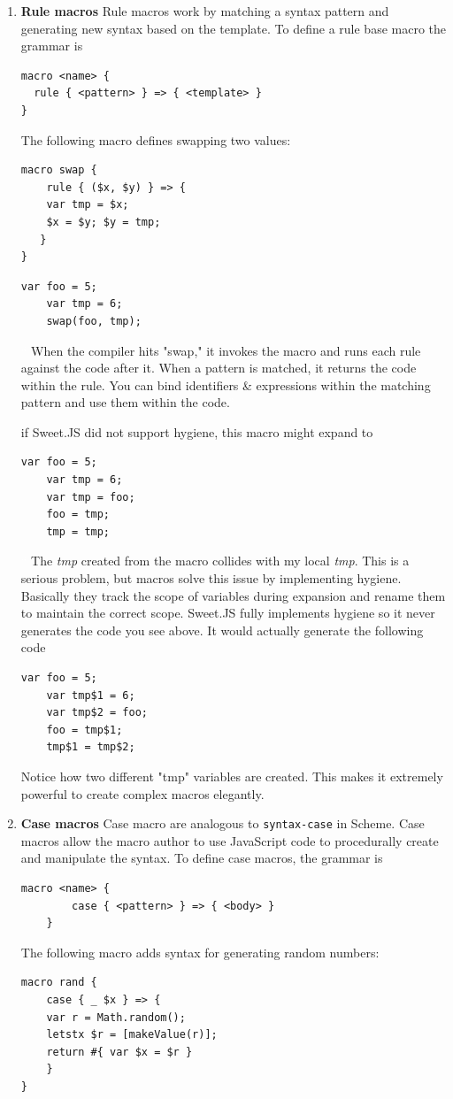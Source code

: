 \begin{enumerate}
\item {\bf Rule macros }
Rule macros work by matching a syntax pattern and generating new syntax based on the template.
To define a rule base macro the grammar is
\begin{lstlisting}[frame=single]
macro <name> {
  rule { <pattern> } => { <template> }
}
\end{lstlisting} 

The following macro defines swapping two values:
\begin{lstlisting}[frame=single]
macro swap {
	rule { ($x, $y) } => {
	var tmp = $x;
	$x = $y; $y = tmp;
   }
}
\end{lstlisting}
\begin{lstlisting}[frame=single]
	var foo = 5;
	var tmp = 6;
	swap(foo, tmp);
\end{lstlisting} 
\textcolor{white}{``}
When the compiler hits "swap," it invokes the macro and runs each rule against the code after it. When a pattern is matched, it returns the code within the rule. You can bind identifiers \& expressions within the matching pattern and use them within the code.\textcolor{white}{''}

if Sweet.JS did not support hygiene, this macro might expand to
\begin{lstlisting}[frame=single]
	var foo = 5;
	var tmp = 6;
	var tmp = foo;
	foo = tmp;
	tmp = tmp;
\end{lstlisting} \textcolor{white}{``}
The \textit{tmp} created from the macro collides with my local \textit{tmp}. This is a serious problem, but macros solve this issue by implementing hygiene. Basically they track the scope of variables during expansion and rename them to maintain the correct scope. Sweet.JS fully implements hygiene so it never generates the code you see above. It would actually generate the following code\textcolor{white}{''}
\begin{lstlisting}[frame=single]
	var foo = 5;
	var tmp$1 = 6;
	var tmp$2 = foo;
	foo = tmp$1;
	tmp$1 = tmp$2;
\end{lstlisting} 
Notice how two different "tmp" variables are created. This makes it extremely powerful to create complex macros elegantly.

\item {\bf Case macros }
Case macro are analogous to \texttt{syntax-case} in Scheme. Case macros allow the macro author to use JavaScript code to procedurally create and manipulate the syntax.
To define case macros, the grammar is
\begin{lstlisting}[frame=single]
	macro <name> {
  		case { <pattern> } => { <body> }
	}
\end{lstlisting}
The following macro adds syntax for generating random numbers:
\begin{lstlisting}[frame=single]
macro rand {
	case { _ $x } => {
	var r = Math.random();
	letstx $r = [makeValue(r)];
	return #{ var $x = $r }
	}
}


\end{lstlisting}
\end{enumerate}
